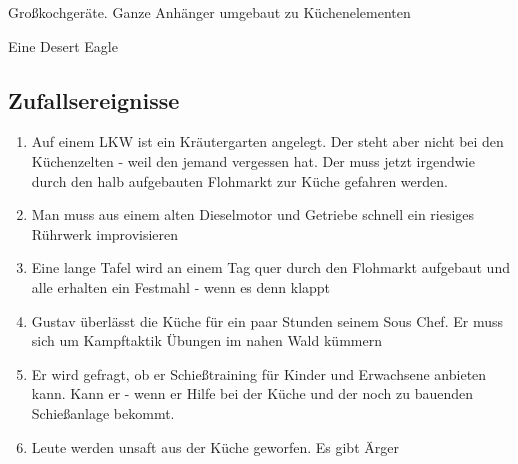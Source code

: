 \begin{npcBox}[title=Gustav Müller]
    \begin{stressSection}
    \end{stressSection}
    \begin{tabularx}{\textwidth}{ XX }
    \end{tabularx}

    \begin{consequences}
    \item {}
    \item {}
    \item {}
    \end{consequences}

    \begin{equipment}
    \item Großkochgeräte. Ganze Anhänger umgebaut zu Küchenelementen
    \item Eine Desert Eagle
    \end{equipment}
\end{npcBox}


\subsection{Zufallsereignisse}

\begin{enumerate}
\item Auf einem LKW ist ein Kräutergarten angelegt. Der steht aber nicht bei den Küchenzelten - weil den jemand vergessen hat. Der muss jetzt irgendwie durch den halb aufgebauten Flohmarkt zur Küche gefahren werden.
\item Man muss aus einem alten Dieselmotor und Getriebe schnell ein riesiges Rührwerk improvisieren
\item Eine lange Tafel wird an einem Tag quer durch den Flohmarkt aufgebaut und alle erhalten ein Festmahl - wenn es denn klappt
\item Gustav überlässt die Küche für ein paar Stunden seinem Sous Chef. Er muss sich um Kampftaktik Übungen im nahen Wald kümmern
\item Er wird gefragt, ob er Schießtraining für Kinder und Erwachsene anbieten kann. Kann er - wenn er Hilfe bei der Küche und der noch zu bauenden Schießanlage bekommt.
\item Leute werden unsaft aus der Küche geworfen. Es gibt Ärger
\end{enumerate}

